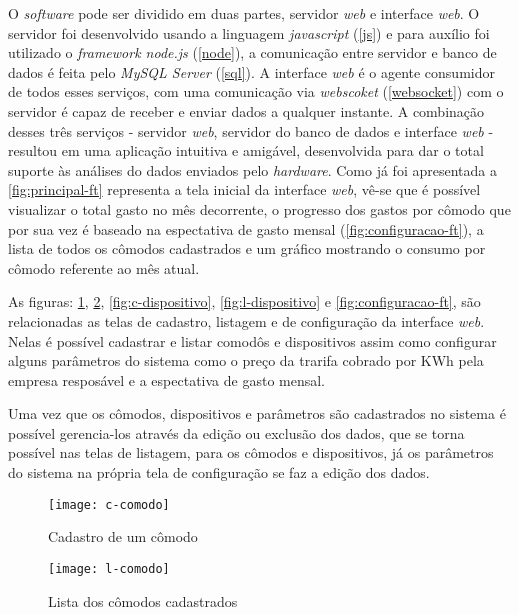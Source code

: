 O \textit{software} pode ser dividido em duas partes, servidor \textit{web} e interface \textit{web}. O servidor foi desenvolvido usando a linguagem
\textit{javascript} (\autoref{js}) e para auxílio foi utilizado o \textit{framework node.js} (\autoref{node}), a comunicação entre servidor e banco de dados
é feita pelo \textit{MySQL Server} (\autoref{sql}). A interface \textit{web} é o agente consumidor de todos esses serviços, com uma comunicação via 
\textit{webscoket} (\autoref{websocket}) com o servidor é capaz de receber e enviar dados a qualquer instante. A combinação desses três serviços - servidor \textit{web},
servidor do banco de dados e interface \textit{web} - resultou em uma aplicação intuitiva e amigável, desenvolvida para dar o total suporte às análises do dados
enviados pelo \textit{hardware}. Como já foi apresentada a \autoref{fig:principal-ft} representa a tela inicial da interface \textit{web}, vê-se que é possível
visualizar o total gasto no mês decorrente, o progresso dos gastos por cômodo que por sua vez é baseado na espectativa de gasto mensal (\autoref{fig:configuracao-ft}), a lista
de todos os cômodos cadastrados e um gráfico mostrando o consumo por cômodo referente ao mês atual.

As figuras: \ref{fig:c-comodo}, \ref{fig:l-comodo}, \ref{fig:c-dispositivo}, \ref{fig:l-dispositivo} e \ref{fig:configuracao-ft}, 
são relacionadas as telas de cadastro, listagem e de configuração da interface \textit{web}. Nelas é possível cadastrar e listar comodôs e dispositivos assim como 
configurar alguns parâmetros do sistema como o preço da trarifa cobrado por KWh pela empresa resposável e a espectativa de gasto mensal.

Uma vez que os cômodos, dispositivos e parâmetros são cadastrados no sistema é possível gerencia-los através da edição ou exclusão dos dados, que se torna possível
nas telas de listagem, para os cômodos e dispositivos, já os parâmetros do sistema na própria tela de configuração se faz a edição dos dados. 

\begin{figure}[h!]
	\texttt{[image: c-comodo]}
	\centering
	\caption[Cadastro de um cômodo]{Cadastro de um cômodo}
	\label{fig:c-comodo}
\end{figure}
\FloatBarrier

\begin{figure}[h!]
	\texttt{[image: l-comodo]}
	\centering
	\caption[Lista dos cômodos cadastrados]{Lista dos cômodos cadastrados}
	\label{fig:l-comodo}
\end{figure}
\FloatBarrier

